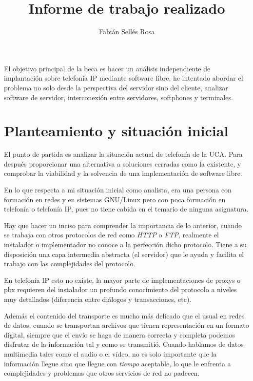 \documentclass{article}
\title{\huge{Informe de trabajo realizado}}
\author{Fabián Sellés Rosa}
\date{}
\begin{document}
\maketitle{}

El objetivo principal de la beca es hacer un análisis independiente de implantación sobre telefonía IP mediante software libre, he intentado abordar el problema no solo desde la perspectiva del servidor sino del cliente, analizar software de servidor, interconexión entre servidores, softphones y terminales.

\section{Planteamiento y situación inicial}
\label{sec:plant-y-situ}

El punto de partida es analizar la situación actual de telefonía de la UCA. Para después  proporcionar una alternativa a soluciones cerradas como la existente, y comprobar la viabilidad y la solvencia de una implementación de software libre.

En lo que respecta a mi situación inicial como analista, era una persona con formación en redes y en sistemas GNU/Linux pero con poca formación en telefonía o telefonía IP, pues no tiene cabida en el temario de ninguna asignatura.

Hay que hacer un inciso para comprender la importancia de lo anterior, cuando se trabaja con otros protocolos de red como \emph{HTTP} o \emph{FTP}, realmente el instalador o implementador no conoce a la perfección dicho protocolo. Tiene a su disposición una capa intermedia abstracta (el servidor) que le ayuda y facilita el trabajo con las complejidades del protocolo.

En telefonía IP esto no existe, la mayor parte de implementaciones de proxys o pbx requieren del instalador un profundo conocimiento del protocolo a niveles muy detallados (diferencia entre diálogos y transacciones, etc).

Además el contenido del transporte es mucho más delicado que el usual en redes de datos, cuando se transportan archivos que tienen representación en un formato digital, siempre que el envío se haga de manera correcta y completa podemos disfrutar de la información tal y como se transmitió. Cuando hablamos de datos multimedia tales como el audio o el vídeo, no es solo importante que la información llegue sino que llegue con \emph{tiempo} aceptable, lo que le enfrenta a complejidades y problemas que otros servicios de red no padecen.
\end{document}

